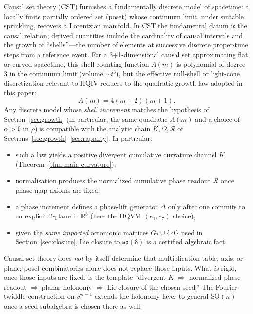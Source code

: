 \documentclass[11pt]{amsart}
\begin{document}
Causal set theory (CST) furnishes a fundamentally discrete model of spacetime: a locally finite partially ordered set (poset) whose continuum limit, under suitable sprinkling, recovers a Lorentzian manifold. In CST the fundamental datum is the causal relation; derived quantities include the cardinality of causal intervals and the growth of ``shells''---the number of elements at successive discrete proper-time steps from a reference event. For a 3+1-dimensional causal set approximating flat or curved spacetime, this shell-counting function \(A(m)\) is polynomial of degree 3 in the continuum limit (volume \(\sim t^3\)), but the effective null-shell or light-cone discretization relevant to HQIV reduces to the quadratic growth law adopted in this paper:
\[
A(m)=4(m+2)(m+1).
\]
Any discrete model whose \emph{shell increment} matches the hypothesis of Section~\ref{sec:growth} (in particular, the same quadratic \(A(m)\) and a choice of \(\alpha>0\) in \(\rho\)) is compatible with the analytic chain \(K,\Omega,\mathcal{R}\) of Sections~\ref{sec:growth}--\ref{sec:rapidity}. In particular:
\begin{itemize}
  \item such a law yields a positive divergent cumulative curvature channel \(K\) (Theorem~\ref{thm:main-curvature});
  \item normalization produces the normalized cumulative phase readout \(\mathcal{R}\) once phase-map axioms are fixed;
  \item a phase increment defines a phase-lift generator \(\Delta\) only after one commits to an explicit \(2\)-plane in \(\mathbb{R}^8\) (here the HQVM \((e_1,e_7)\) choice);
  \item given the \emph{same imported} octonionic matrices \(G_2\cup\{\Delta\}\) used in Section~\ref{sec:closure}, Lie closure to \(\mathfrak{so}(8)\) is a certified algebraic fact.
\end{itemize}
Causal set theory does \emph{not} by itself determine that multiplication table, axis, or plane; poset combinatorics alone does not replace those inputs. What \emph{is} rigid, once those inputs are fixed, is the template ``divergent \(K\) \(\Rightarrow\) normalized phase readout \(\Rightarrow\) planar holonomy \(\Rightarrow\) Lie closure of the chosen seed.'' The Fourier-twiddle construction on \(S^{n-1}\) extends the holonomy layer to general \(\mathrm{SO}(n)\) once a seed subalgebra is chosen there as well.
\end{document}
